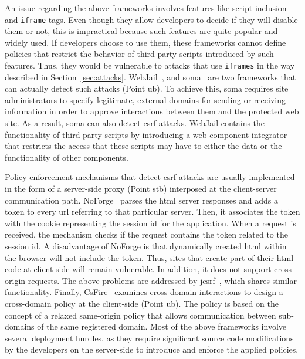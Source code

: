 \documentclass[10pt,journal,compsoc]{IEEEtran}
\begin{document}
An issue regarding the above frameworks
involves features like script inclusion
and {\tt iframe} tags. Even though they allow developers
to decide if they will disable them or not,
this is impractical because such features are quite popular and widely used.
If developers choose to use them, these frameworks cannot
define policies that restrict the behavior of third-party
scripts introduced by such features. Thus, they would
be vulnerable to attacks that use {\tt iframes}
in the way described in Section~\ref{sec:attacks}.
WebJail~\cite{VDDPJ11}, and {\sc soma}~\cite{OWVS08}
are two frameworks that can actually detect such attacks (Point {\sc
  ub}). To achieve this, {\sc soma} requires site administrators to
specify legitimate, external domains for sending or receiving
information in order to approve interactions between them and the
protected web site. As a result, {\sc soma} can also detect {\sc csrf}
attacks. WebJail contains the functionality of third-party scripts by
introducing a web component integrator that restricts the access that
these scripts may have to either the data or the functionality of
other components.

Policy enforcement mechanisms that detect {\sc csrf}
attacks are usually implemented in the form of a
server-side proxy (Point {\sc s}t{\sc b})
interposed at the client-server communication path.
NoForge~\cite{JKK06a}
parses the {\sc html} server responses
and adds a token to every {\sc url} referring to that particular
server. Then, it associates the token with the cookie
representing the session {\sc id} for the application.
When a request is received, the mechanism checks
if the request contains the token related
to the session {\sc id}. A disadvantage of NoForge
is that  dynamically created {\sc html} within
the browser will not include the token.
Thus, sites that create part of their {\sc html} code at client-side
will remain vulnerable. In addition, it does not
support cross-origin requests.
The above problems are addressed by j{\sc csrf}~\cite{PS11},
which shares similar functionality.
Finally, CsFire~\cite{DDHPJ10}
examines cross-domain interactions to design a
cross-domain policy at the client-side (Point {\sc ub}).
The policy is based on the concept of a relaxed
same-origin policy that allows communication between
sub-domains of the same registered domain.
Most of the above frameworks involve
several deployment hurdles, as they
require significant source code modifications by the
developers on the server-side to introduce and enforce
the applied policies.
\end{document}
